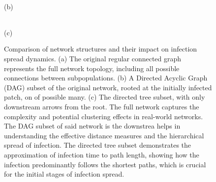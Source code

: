 \begin{figure}[ht]
\begin{minipage}[b]{0.3\textwidth}
\begin{tikzpicture}[
          node distance=1cm and 1cm,
          every node/.style={circle, draw, minimum size=.75cm}
        ]
        \end{tikzpicture}\\
        \centering
        {(b)}
    \end{minipage}
    \begin{minipage}[b]{0.3\textwidth}
        \\
        \centering
        {(c)}
    \end{minipage}
    \caption{\small Comparison of network structures and their impact on infection spread dynamics. 
    (a) The original regular connected graph represents the full network topology, including all possible connections between subpopulations. 
    (b) A Directed Acyclic Graph (DAG) subset of the original network, rooted at the initially infected patch, on of possible many.
    (c) The directed tree subset, with only downstream arrows from the root.
     The full network captures the complexity and potential clustering effects in real-world networks. The DAG subset of said network is the downstrea helps in understanding the effective distance measures and the hierarchical spread of infection. The directed tree subset demonstrates the approximation of infection time to path length, showing how the infection predominantly follows the shortest paths, which is crucial for the initial stages of infection spread.}
    \label{fig: graph subsets}
\end{figure}


    
% 